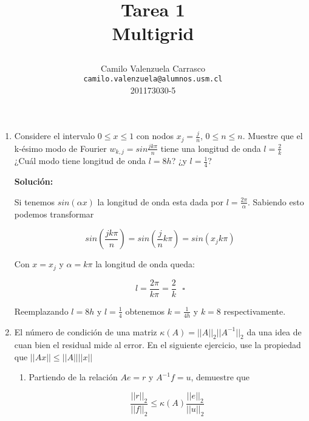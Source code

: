 \documentclass[spanish]{article}
\title{\begin{center}
  \label{fig:ejemplo}
 \end{center}
  Tarea 1\\ Multigrid\\
  \textit{}
}
\author{
  Camilo Valenzuela Carrasco \\ \texttt{camilo.valenzuela@alumnos.usm.cl}
  \\ 201173030-5
}
\begin{document}
  \maketitle
  
    
  
  
  
  \begin{enumerate}
      \item Considere el intervalo $0 \leq x \leq 1$ con nodos $x_j =\frac{j}{n}$, $0 \leq n \leq n$. Muestre que el k-ésimo modo de Fourier $w_{k,j} = sin\frac{jk\pi}{n}$ tiene una longitud de onda $l = \frac{2}{k}$ ¿Cuál modo tiene longitud de onda $l = 8h$? ¿y $l = \frac{1}{4}$?
      
      \textbf{Solución:} 
      
      Si tenemos $sin(\alpha x)$ la longitud de onda esta dada por $l = \frac{2\pi}{\alpha}$. Sabiendo esto podemos transformar 
      
      $$sin \left(\frac{jk\pi}{n}\right) = sin \left(\frac{j}{n} k\pi \right) = sin\left(x_j k\pi\right)$$
      
      Con $x = x_j$ y $\alpha = k\pi$ la longitud de onda queda:
      
      $$ l = \frac{2\pi}{k\pi} = \frac{2}{k} \ \ \ \square$$
      
      Reemplazando $l = 8h$ y $l = \frac{1}{4}$ obtenemos $k = \frac{1}{4h}$ y $k=8$ respectivamente.
      
      \item El número de condición de una matriz $\kappa(A) = ||A||_2 ||A^{-1}||_2$ da una idea de cuan bien el residual mide al error. En el siguiente ejercicio, use la propiedad que $||Ax||\leq ||A||||x||$
      
        \begin{enumerate}
            \item Partiendo de la relación $Ae = r$ y $A^{-1}f = u$, demuestre que
            
            $$ \frac{||r||_2}{||f||_2} \leq \kappa(A) \frac{||e||_2}{||u||_2}$$
            

\end{enumerate}
\end{enumerate}
\end{document}
